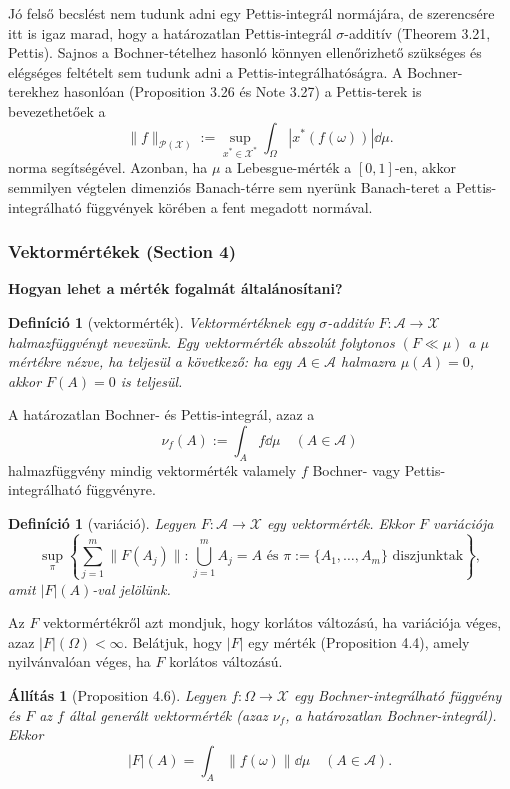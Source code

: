 \documentclass[handout]{beamer} %
\newtheorem{defi}[lem]{Definíció}
\newtheorem{allitas}[lem]{Állítás}
\begin{document}
\begin{frame}
\justifying
Jó felső becslést nem tudunk adni egy Pettis-integrál normájára, de szerencsére itt is igaz marad, hogy a határozatlan Pettis-integrál $\sigma$-additív (Theorem 3.21, Pettis). Sajnos a Bochner-tételhez hasonló könnyen ellenőrizhető szükséges és elégséges feltételt sem tudunk adni a Pettis-integrálhatóságra.
A Bochner-terekhez hasonlóan (Proposition 3.26 és Note 3.27) a Pettis-terek is bevezethetőek a
$$
\|f\|_{\mathcal{P}(\mathcal{X})} := \sup_{x^* \in \mathcal{X}^*} \int_{\Omega} | x^*(f(\omega)) | \dd{\mu}.
$$
norma segítségével. Azonban, ha $\mu$ a Lebesgue-mérték a $[0,1]$-en, akkor semmilyen végtelen dimenziós Banach-térre sem nyerünk Banach-teret a Pettis-integrálható függvények körében a fent megadott normával.
\end{frame}

\begin{frame}
\justifying
\frametitle{Vektormértékek (Section 4)}
\textbf{Hogyan lehet a mérték fogalmát általánosítani?}
\begin{defi}[vektormérték]Vektormértéknek egy $\sigma$-additív  $F \colon \mathcal{A} \to \mathcal{X}$ halmazfüggvényt nevezünk. Egy vektormérték abszolút folytonos $(F \ll \mu)$ a $\mu$ mértékre nézve, ha teljesül a következő: ha egy $A \in \mathcal{A}$ halmazra $\mu(A) = 0$, akkor $F(A)=0$ is teljesül.
\end{defi}
A határozatlan Bochner- és Pettis-integrál, azaz a 
$$\nu_f(A) := \int_{A} f \dd{\mu} \quad (A \in \mathcal{A})$$
halmazfüggvény mindig vektormérték valamely $f$ Bochner- vagy Pettis-integrálható függvényre.
\end{frame}

\begin{frame}
\justifying
\begin{defi}[variáció]
Legyen $F\colon \mathcal{A} \to \mathcal{X}$ egy vektormérték. Ekkor $F$ variációja
$$\sup_{\pi} \left\lbrace \sum^{m}_{j=1} \| F(A_j) \| : \bigcup^{m}_{j=1} A_j = A \text{ és } \pi := \lbrace A_1, \ldots, A_m \rbrace \text{ diszjunktak} \right\rbrace,$$
amit $|F|(A)$-val jelölünk.
\end{defi}
Az $F$ vektormértékről azt mondjuk, hogy korlátos változású, ha variációja véges, azaz $|F|(\Omega) < \infty.$ Belátjuk, hogy $|F|$ egy mérték (Proposition 4.4), amely nyilvánvalóan véges, ha $F$ korlátos változású.
\begin{allitas}[Proposition 4.6] Legyen $f \colon \Omega \to \mathcal{X}$ egy Bochner-integrálható függvény és $F$ az $f$ által generált vektormérték (azaz $\nu_f$, a határozatlan Bochner-integrál). Ekkor 
$$|F|(A) = \int_{A} \| f(\omega) \| \dd{\mu} \quad (A \in \mathcal{A}).$$
\end{allitas}
\end{frame}
\end{document}
